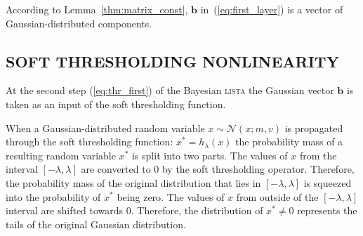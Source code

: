 \documentclass[letterpaper]{article}
\begin{document}
According to Lemma~\ref{thm:matrix_const}, $\mathbf{b}$ in~(\ref{eq:first_layer}) is a vector of Gaussian-distributed components.


\subsection{\uppercase{Soft thresholding nonlinearity}}
At the second step (\ref{eq:thr_first}) of the Bayesian \textsc{lista} the Gaussian vector $\mathbf{b}$ is taken as an input of the soft thresholding function.

When a Gaussian-distributed random variable $x \sim \mathcal{N}(x; m, v)$ is propagated through the soft thresholding function: $x^* = h_{\lambda}(x)$ the probability mass of a resulting random variable $x^*$ is split into two parts. The values of $x$ from the interval $[-\lambda, \lambda]$ are converted to $0$ by the soft thresholding operator. Therefore, the probability mass of the original distribution that lies in $[-\lambda, \lambda]$ is squeezed into the probability of $x^*$ being zero. The values of $x$ from outside of the $[-\lambda, \lambda]$ interval are shifted towards $0$. Therefore, the distribution of $x^* \neq 0$ represents the tails of the original Gaussian distribution.
\end{document}
